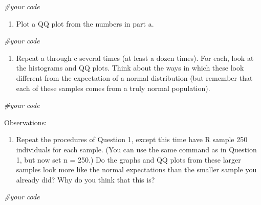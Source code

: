 \documentclass[
]{article}
\newenvironment{Shaded}{\begin{snugshade}}{\end{snugshade}}
\newcommand{\CommentTok}[1]{\textcolor[rgb]{0.56,0.35,0.01}{\textit{#1}}}
\providecommand{\tightlist}{%
  \setlength{\itemsep}{0pt}\setlength{\parskip}{0pt}}
\begin{document}
\begin{Shaded}
\begin{Highlighting}[]
\CommentTok{\#your code}
\end{Highlighting}
\end{Shaded}

\begin{enumerate}
\def\labelenumi{\Alph{enumi})}
\setcounter{enumi}{2}
\tightlist
\item
  Plot a QQ plot from the numbers in part a.
\end{enumerate}

\begin{Shaded}
\begin{Highlighting}[]
\CommentTok{\#your code}
\end{Highlighting}
\end{Shaded}

\begin{enumerate}
\def\labelenumi{\Alph{enumi})}
\setcounter{enumi}{3}
\tightlist
\item
  Repeat a through c several times (at least a dozen times). For each,
  look at the histograms and QQ plots. Think about the ways in which
  these look different from the expectation of a normal distribution
  (but remember that each of these samples comes from a truly normal
  population).
\end{enumerate}

\begin{Shaded}
\begin{Highlighting}[]
\CommentTok{\#your code}
\end{Highlighting}
\end{Shaded}

Observations:

\begin{enumerate}
\def\labelenumi{\arabic{enumi}.}
\setcounter{enumi}{1}
\tightlist
\item
  Repeat the procedures of Question 1, except this time have R sample
  250 individuals for each sample. (You can use the same command as in
  Question 1, but now set n = 250.) Do the graphs and QQ plots from
  these larger samples look more like the normal expectations than the
  smaller sample you already did? Why do you think that this is?
\end{enumerate}

\begin{Shaded}
\begin{Highlighting}[]
\CommentTok{\#your code}
\end{Highlighting}
\end{Shaded}
\end{document}
